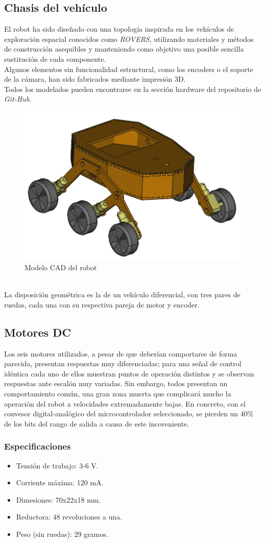 \subsection{Chasis del vehículo}
El robot ha sido diseñado con una topología inspirada en los vehículos de exploración espacial conocidos como \textit{ROVERS}, utilizando materiales y métodos de construcción asequibles y
manteniendo como objetivo una posible sencilla sustitución de cada componente. \\
Algunos elementos sin funcionalidad estructural, como los encoders o el soporte de la cámara, han sido fabricados mediante impresión 3D. \\
Todos los modelados pueden encontrarse en la sección hardware del repositorio de \textit{Git-Hub}.
\begin{figure}[h!]
	\centering
	\includegraphics[width=.5\textwidth]{images/hw/wheele_stl}
	\caption{Modelo CAD del robot}
\end{figure}
\\
La disposición geométrica es la de un vehículo diferencial, con tres pares de ruedas, cada una con su respectiva pareja de motor y encoder.\\

\subsection{Motores DC}
 Los seis motores utilizados, a pesar de que deberían comportarse de forma parecida, presentan respuestas muy diferenciadas; para una señal de control idéntica cada uno de ellos muestran puntos de operación distintos y se observan respuestas ante escalón muy variadas. Sin embargo, 
 todos presentan un comportamiento común, una gran zona muerta que complicará mucho la operación del robot a velocidades extremadamente bajas. En concreto, con el convesor digital-analógico del microcontrolador seleccionado, se pierden un 40\% de los bits del rango de salida a causa de este incoveniente.  
\subsubsection{Especificaciones}
\begin{itemize}
	\item Tensión de trabajo: 3-6 V.
	\item Corriente máxima: 120 mA.
	\item Dimesiones: 70x22x18 mm.
	\item Reductora: 48 revoluciones a una.
	\item Peso (sin ruedas): 29 gramos.
\end{itemize}

